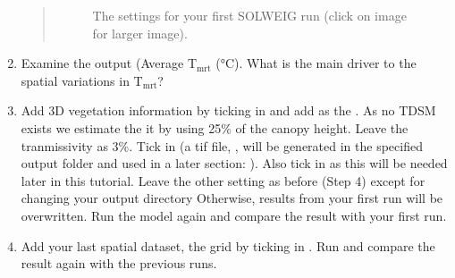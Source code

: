 \documentclass[letterpaper,10pt,english]{sphinxmanual}
\let\sphinxpxdimen\pdfpxdimen\else\newdimen\sphinxpxdimen
\begin{document}
\begin{enumerate}
\begin{quote}
\begin{figure}[htbp]
\noindent\sphinxincludegraphics[width=1078\sphinxpxdimen]{{SOLWEIG_Tmrt1_solweig}.png}
\caption{The settings for your first SOLWEIG run (click on image for larger image).}\label{\detokenize{Tutorials/IntroductionToSolweig:id6}}\end{figure}
\end{quote}

\item {} 
Examine the output (Average T$_{\text{mrt}}$ (°C). What is the main
driver to the spatial variations in T$_{\text{mrt}}$?

\item {} 
Add 3D vegetation information by ticking in  and add  as the . As no TDSM exists we estimate the it by using 25\% of the
canopy height. Leave the tranmissivity as 3\%. Tick in  (a tif file, , will be generated in the
specified output folder and used in a later section: ). Also tick in  as
this will be needed later in this tutorial. Leave the other setting
as before (Step 4) except for changing your output directory
Otherwise, results from your first run will be overwritten. Run the
model again and compare the result with your first run.

\item {} 
Add your last spatial dataset, the  grid by ticking in
. Run and compare the
result again with the previous runs.

\end{enumerate}
\end{document}
